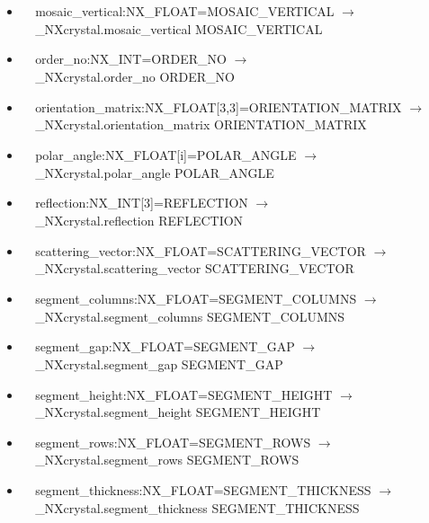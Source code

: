 \documentclass[11pt]{article}
\begin{document}
{{\begin{itemize}
\item{\verb|  |mosaic\_vertical:NX\_FLOAT=MOSAIC\_VERTICAL $\rightarrow$\\
\verb|  |\_NXcrystal.mosaic\_vertical MOSAIC\_VERTICAL}

\item{\verb|  |order\_no:NX\_INT=ORDER\_NO $\rightarrow$\\
\verb|  |\_NXcrystal.order\_no ORDER\_NO}

\item{\verb|  |orientation\_matrix:NX\_FLOAT[3,3]=ORIENTATION\_MATRIX $\rightarrow$\\
\verb|  |\_NXcrystal.orientation\_matrix ORIENTATION\_MATRIX}

\item{\verb|  |polar\_angle:NX\_FLOAT[i]=POLAR\_ANGLE $\rightarrow$\\
\verb|  |\_NXcrystal.polar\_angle POLAR\_ANGLE}

\item{\verb|  |reflection:NX\_INT[3]=REFLECTION $\rightarrow$\\
\verb|  |\_NXcrystal.reflection REFLECTION}

\item{\verb|  |scattering\_vector:NX\_FLOAT=SCATTERING\_VECTOR $\rightarrow$\\
\verb|  |\_NXcrystal.scattering\_vector SCATTERING\_VECTOR}

\item{\verb|  |segment\_columns:NX\_FLOAT=SEGMENT\_COLUMNS $\rightarrow$\\
\verb|  |\_NXcrystal.segment\_columns SEGMENT\_COLUMNS}

\item{\verb|  |segment\_gap:NX\_FLOAT=SEGMENT\_GAP $\rightarrow$\\
\verb|  |\_NXcrystal.segment\_gap SEGMENT\_GAP}

\item{\verb|  |segment\_height:NX\_FLOAT=SEGMENT\_HEIGHT $\rightarrow$\\
\verb|  |\_NXcrystal.segment\_height SEGMENT\_HEIGHT}

\item{\verb|  |segment\_rows:NX\_FLOAT=SEGMENT\_ROWS $\rightarrow$\\
\verb|  |\_NXcrystal.segment\_rows SEGMENT\_ROWS}

\item{\verb|  |segment\_thickness:NX\_FLOAT=SEGMENT\_THICKNESS $\rightarrow$\\
\verb|  |\_NXcrystal.segment\_thickness SEGMENT\_THICKNESS}


\end{itemize}}}
\end{document}
